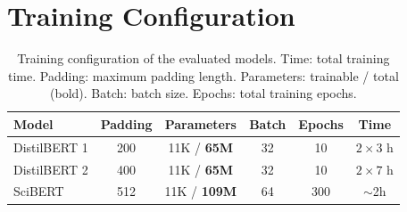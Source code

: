 \documentclass{article}
\theoremstyle{plain}
\theoremstyle{definition}
\theoremstyle{remark}
\begin{document}
\section{Training Configuration}

\begin{table}[H]
\centering
\small
\begin{tabular}{|l|c|c|c|c|c|}
\hline
Model & Padding & Parameters & Batch & Epochs & Time \\
\hline
DistilBERT 1 & 200 & 11K / \textbf{65M} & 32 & 10 & $2 \times 3$ h \\
\hline
DistilBERT 2 & 400 & 11K / \textbf{65M} & 32 & 10 & $2 \times 7$ h \\
\hline
SciBERT & 512 & 11K / \textbf{109M} & 64 & 300 & $\sim$2h \\
\hline
\end{tabular}
\caption{\small Training configuration of the evaluated models. Time: total training time. Padding: maximum padding length. Parameters: trainable / total (bold). Batch: batch size. Epochs: total training epochs.}
\label{tab:training_config}
\end{table}
\end{document}
